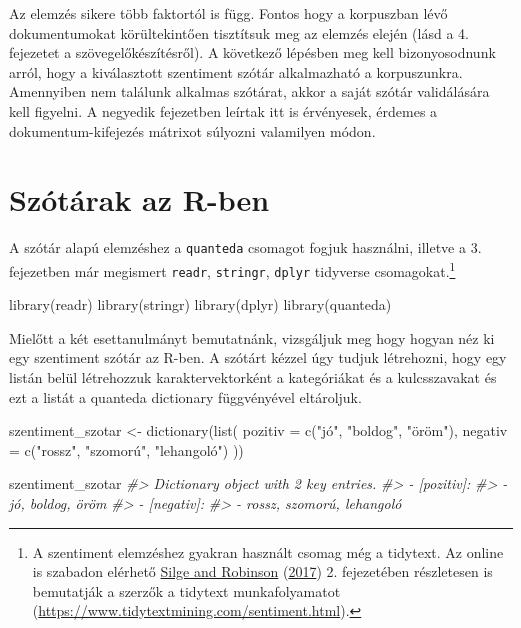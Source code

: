 \documentclass[
]{book}
\newenvironment{Shaded}{\begin{snugshade}}{\end{snugshade}}
\newcommand{\AttributeTok}[1]{\textcolor[rgb]{0.77,0.63,0.00}{#1}}
\newcommand{\CommentTok}[1]{\textcolor[rgb]{0.56,0.35,0.01}{\textit{#1}}}
\newcommand{\FunctionTok}[1]{\textcolor[rgb]{0.00,0.00,0.00}{#1}}
\newcommand{\NormalTok}[1]{#1}
\newcommand{\OtherTok}[1]{\textcolor[rgb]{0.56,0.35,0.01}{#1}}
\newcommand{\StringTok}[1]{\textcolor[rgb]{0.31,0.60,0.02}{#1}}
\begin{document}
Az elemzés sikere több faktortól is függ. Fontos hogy a korpuszban lévő
dokumentumokat körültekintően tisztítsuk meg az elemzés elején (lásd a
4. fejezetet a szövegelőkészítésről). A következő lépésben meg kell
bizonyosodnunk arról, hogy a kiválasztott szentiment szótár alkalmazható
a korpuszunkra. Amennyiben nem találunk alkalmas szótárat, akkor a saját
szótár validálására kell figyelni. A negyedik fejezetben leírtak itt is
érvényesek, érdemes a dokumentum-kifejezés mátrixot súlyozni valamilyen
módon.

\hypertarget{szuxf3tuxe1rak-az-r-ben}{%
\section{Szótárak az R-ben}\label{szuxf3tuxe1rak-az-r-ben}}

A szótár alapú elemzéshez a \texttt{quanteda} csomagot fogjuk használni,
illetve a 3. fejezetben már megismert \texttt{readr}, \texttt{stringr},
\texttt{dplyr} tidyverse csomagokat.\footnote{A szentiment elemzéshez
  gyakran használt csomag még a tidytext. Az online is szabadon elérhető
  \protect\hyperlink{ref-silge2017text}{Silge and Robinson}
  (\protect\hyperlink{ref-silge2017text}{2017}) 2. fejezetében
  részletesen is bemutatják a szerzők a tidytext munkafolyamatot
  (\url{https://www.tidytextmining.com/sentiment.html}).}

\begin{Shaded}
\begin{Highlighting}[]
\FunctionTok{library}\NormalTok{(readr)}
\FunctionTok{library}\NormalTok{(stringr)}
\FunctionTok{library}\NormalTok{(dplyr)}
\FunctionTok{library}\NormalTok{(quanteda)}
\end{Highlighting}
\end{Shaded}

Mielőtt a két esettanulmányt bemutatnánk, vizsgáljuk meg hogy hogyan néz
ki egy szentiment szótár az R-ben. A szótárt kézzel úgy tudjuk
létrehozni, hogy egy listán belül létrehozzuk karaktervektorként a
kategóriákat és a kulcsszavakat és ezt a listát a quanteda dictionary
függvényével eltároljuk.

\begin{Shaded}
\begin{Highlighting}[]
\NormalTok{szentiment\_szotar }\OtherTok{\textless{}{-}} \FunctionTok{dictionary}\NormalTok{(}\FunctionTok{list}\NormalTok{(}
  \AttributeTok{pozitiv =} \FunctionTok{c}\NormalTok{(}\StringTok{"jó"}\NormalTok{, }\StringTok{"boldog"}\NormalTok{, }\StringTok{"öröm"}\NormalTok{),}
  \AttributeTok{negativ =} \FunctionTok{c}\NormalTok{(}\StringTok{"rossz"}\NormalTok{, }\StringTok{"szomorú"}\NormalTok{, }\StringTok{"lehangoló"}\NormalTok{)}
\NormalTok{))}

\NormalTok{szentiment\_szotar}
\CommentTok{\#\textgreater{} Dictionary object with 2 key entries.}
\CommentTok{\#\textgreater{} {-} [pozitiv]:}
\CommentTok{\#\textgreater{}   {-} jó, boldog, öröm}
\CommentTok{\#\textgreater{} {-} [negativ]:}
\CommentTok{\#\textgreater{}   {-} rossz, szomorú, lehangoló}
\end{Highlighting}
\end{Shaded}
\end{document}

